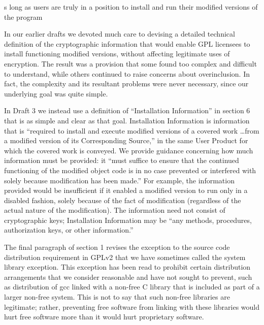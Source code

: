 
s long as users are truly in a position to install and run
their modified versions of the program

In our earlier drafts we devoted much care to devising a detailed technical
definition of the cryptographic information that would enable GPL licensees
to install functioning modified versions, without affecting legitimate uses
of encryption.  The result was a provision that some found too complex and
difficult to understand, while others continued to raise concerns about
overinclusion.  In fact, the complexity and its resultant problems were never
necessary, since our underlying goal was quite simple.

In Draft 3 we instead use a definition of ``Installation Information'' in
section 6 that is as simple and clear as that goal.  Installation Information
is information that is ``required to install and execute modified versions of
a covered work \dots from a modified version of its Corresponding Source,''
in the same User Product for which the covered work is conveyed.  We provide
guidance concerning how much information must be provided: it ``must suffice
to ensure that the continued functioning of the modified object code is in no
case prevented or interfered with solely because modification has been
made.''  For example, the information provided would be insufficient if it
enabled a modified version to run only in a disabled fashion, solely because
of the fact of modification (regardless of the actual nature of the
modification).  The information need not consist of cryptographic keys;
Installation Information may be ``any methods, procedures, authorization
keys, or other information.''



The final paragraph of section 1 revises the exception to the source code
distribution requirement in GPLv2 that we have sometimes called the system
library exception. This exception has been read to prohibit certain
distribution arrangements that we consider reasonable and have not sought to
prevent, such as distribution of gcc linked with a non-free C library that is
included as part of a larger non-free system. This is not to say that such
non-free libraries are legitimate; rather, preventing free software from
linking with these libraries would hurt free software more than it would hurt
proprietary software.

